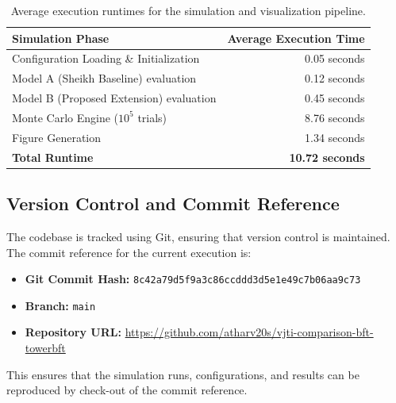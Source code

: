 \documentclass[12pt, oneside, a4paper]{report}
\theoremstyle{definition}
\theoremstyle{remark}
\begin{document}
\begin{table}[htbp]
\centering
\small
\renewcommand{\arraystretch}{1.3}
\begin{tabular}{lr}
\toprule
\textbf{Simulation Phase} & \textbf{Average Execution Time} \\
\midrule
Configuration Loading \& Initialization & 0.05 seconds \\
Model A (Sheikh Baseline) evaluation & 0.12 seconds \\
Model B (Proposed Extension) evaluation & 0.45 seconds \\
Monte Carlo Engine ($10^5$ trials) & 8.76 seconds \\
Figure Generation & 1.34 seconds \\
\midrule
\textbf{Total Runtime} & \textbf{10.72 seconds} \\
\bottomrule
\end{tabular}
\caption{Average execution runtimes for the simulation and visualization pipeline.}
\label{tab:execution_runtimes}
\end{table}

\subsection{Version Control and Commit Reference}
The codebase is tracked using Git, ensuring that version control is maintained. The commit reference for the current execution is:
\begin{itemize}
  \item \textbf{Git Commit Hash:} \texttt{8c42a79d5f9a3c86ccddd3d5e1e49c7b06aa9c73}
  \item \textbf{Branch:} \texttt{main}
  \item \textbf{Repository URL:} \url{https://github.com/atharv20s/vjti-comparison-bft-towerbft}
\end{itemize}
This ensures that the simulation runs, configurations, and results can be reproduced by check-out of the commit reference.



\cleardoublepage


﻿%
\end{document}
